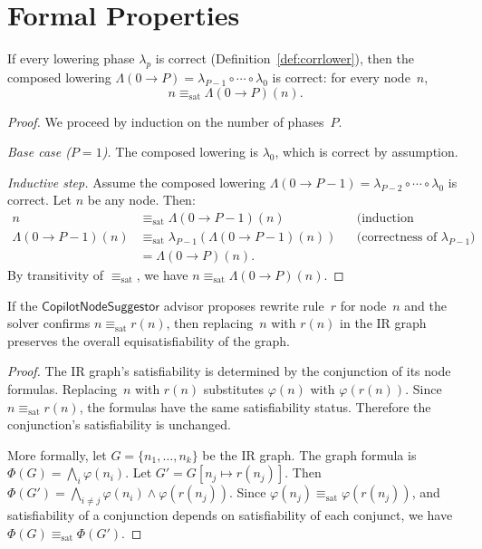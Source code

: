 \documentclass[11pt]{article}
\newcommand{\NodeSugg}{\mathsf{CopilotNodeSuggestor}}
\begin{document}
\section{Formal Properties}\label{sec:formal}

\begin{theorem}%
\label{thm:lowcorrect}
If every lowering phase $\lambda_p$ is correct
(Definition~\ref{def:corrlower}), then the composed
lowering $\Lambda(0 \to P) = \lambda_{P-1} \circ \cdots
\circ \lambda_0$ is correct: for every node~$n$,
\[
  n \equiv_{\mathrm{sat}} \Lambda(0 \to P)(n).
\]
\end{theorem}
\begin{proof}
We proceed by induction on the number of phases~$P$.

\emph{Base case ($P = 1$).}  The composed lowering is
$\lambda_0$, which is correct by assumption.

\emph{Inductive step.}  Assume the composed lowering
$\Lambda(0 \to P-1) = \lambda_{P-2} \circ \cdots \circ
\lambda_0$ is correct.  Let $n$ be any node.  Then:
\begin{align*}
  n &\equiv_{\mathrm{sat}} \Lambda(0 \to P-1)(n)
    && \text{(induction hypothesis)} \\
  \Lambda(0 \to P-1)(n)
  &\equiv_{\mathrm{sat}} \lambda_{P-1}(\Lambda(0 \to P-1)(n))
    && \text{(correctness of $\lambda_{P-1}$)} \\
  &= \Lambda(0 \to P)(n).
\end{align*}
By transitivity of $\equiv_{\mathrm{sat}}$, we have
$n \equiv_{\mathrm{sat}} \Lambda(0 \to P)(n)$.
\end{proof}

\begin{theorem}%
\label{thm:nodesound}
If the $\NodeSugg$ advisor proposes rewrite rule~$r$ for
node~$n$ and the solver confirms
$n \equiv_{\mathrm{sat}} r(n)$, then replacing~$n$ with
$r(n)$ in the IR graph preserves the overall
equisatisfiability of the graph.
\end{theorem}
\begin{proof}
The IR graph's satisfiability is determined by the
conjunction of its node formulas.  Replacing~$n$ with
$r(n)$ substitutes $\varphi(n)$ with $\varphi(r(n))$.
Since $n \equiv_{\mathrm{sat}} r(n)$, the formulas
have the same satisfiability status.  Therefore the
conjunction's satisfiability is unchanged.

More formally, let $G = \{n_1, \ldots, n_k\}$ be the
IR graph.  The graph formula is
$\Phi(G) = \bigwedge_i \varphi(n_i)$.
Let $G' = G[n_j \mapsto r(n_j)]$.  Then
$\Phi(G') = \bigwedge_{i \neq j} \varphi(n_i) \wedge
\varphi(r(n_j))$.
Since $\varphi(n_j) \equiv_{\mathrm{sat}} \varphi(r(n_j))$,
and satisfiability of a conjunction depends on
satisfiability of each conjunct, we have
$\Phi(G) \equiv_{\mathrm{sat}} \Phi(G')$.
\end{proof}
\end{document}
